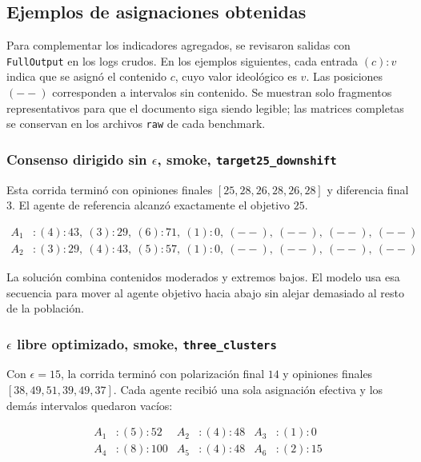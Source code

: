 \documentclass[10pt,letterpaper]{article}
\begin{document}
\subsection{Ejemplos de asignaciones obtenidas}

Para complementar los indicadores agregados, se revisaron salidas con \texttt{FullOutput} en los logs crudos. En los ejemplos siguientes, cada entrada \((c):v\) indica que se asign\'o el contenido \(c\), cuyo valor ideol\'ogico es \(v\). Las posiciones \((--)\) corresponden a intervalos sin contenido. Se muestran solo fragmentos representativos para que el documento siga siendo legible; las matrices completas se conservan en los archivos \texttt{raw} de cada benchmark.

\subsubsection{Consenso dirigido sin \(\epsilon\), smoke, \texttt{target25\_downshift}}

Esta corrida termin\'o con opiniones finales \([25,28,26,28,26,28]\) y diferencia final \(3\). El agente de referencia alcanz\'o exactamente el objetivo \(25\).

\[
\begin{aligned}
A_1 &: (4):43,\ (3):29,\ (6):71,\ (1):0,\ (--),\ (--),\ (--),\ (--)\\
A_2 &: (3):29,\ (4):43,\ (5):57,\ (1):0,\ (--),\ (--),\ (--),\ (--)
\end{aligned}
\]

La soluci\'on combina contenidos moderados y extremos bajos. El modelo usa esa secuencia para mover al agente objetivo hacia abajo sin alejar demasiado al resto de la poblaci\'on.

\subsubsection{\(\epsilon\) libre optimizado, smoke, \texttt{three\_clusters}}

Con \(\epsilon=15\), la corrida termin\'o con polarizaci\'on final \(14\) y opiniones finales \([38,49,51,39,49,37]\). Cada agente recibi\'o una sola asignaci\'on efectiva y los dem\'as intervalos quedaron vac\'ios:

\[
\begin{aligned}
A_1 &: (5):52 &
A_2 &: (4):48 &
A_3 &: (1):0 \\
A_4 &: (8):100 &
A_5 &: (4):48 &
A_6 &: (2):15
\end{aligned}
\]
\end{document}
